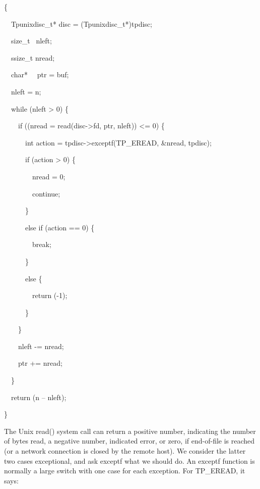 {\ttfamily\mdseries
\{}

{\ttfamily\mdseries
\ \ Tpunixdisc\_t* disc = (Tpunixdisc\_t*)tpdisc;}


\bigskip

{\ttfamily\mdseries
\ \ size\_t \ nleft;}

{\ttfamily\mdseries
\ \ ssize\_t nread;}

{\ttfamily\mdseries
\ \ char* \ \ ptr = buf;}


\bigskip

{\ttfamily\mdseries
\ \ nleft = n;}

{\ttfamily\mdseries
\ \ while (nleft {\textgreater} 0) \{}

{\ttfamily\mdseries
\ \ \ \ if ((nread = read(disc-{\textgreater}fd, ptr, nleft)) {\textless}= 0) \{}

{\ttfamily\mdseries
\ \ \ \ \ \ int action = tpdisc-{\textgreater}exceptf(TP\_EREAD, \&nread, tpdisc);}

{\ttfamily\mdseries
\ \ \ \ \ \ if (action {\textgreater} 0) \{}

{\ttfamily\mdseries
\ \ \ \ \ \ \ \ nread = 0;}

{\ttfamily\mdseries
\ \ \ \ \ \ \ \ continue;}

{\ttfamily\mdseries
\ \ \ \ \ \ \}}

{\ttfamily\mdseries
\ \ \ \ \ \ else if (action == 0) \{}

{\ttfamily\mdseries
\ \ \ \ \ \ \ \ break;}

{\ttfamily\mdseries
\ \ \ \ \ \ \}}

{\ttfamily\mdseries
\ \ \ \ \ \ else \{}

{\ttfamily\mdseries
\ \ \ \ \ \ \ \ return (-1);}

{\ttfamily\mdseries
\ \ \ \ \ \ \}}

{\ttfamily\mdseries
\ \ \ \ \}}


\bigskip

{\ttfamily\mdseries
\ \ \ \ nleft -= nread;}

{\ttfamily\mdseries
\ \ \ \ ptr += nread;}

{\ttfamily\mdseries
\ \ \}}

{\ttfamily\mdseries
\ \ return (n -- nleft);}

{\ttfamily\mdseries
\}}


The Unix read() system call can return a positive number, indicating
the number of bytes read, a negative number, indicated error, or zero,
if end-of-file is reached (or a network connection is closed by the
remote host). We consider the latter two cases exceptional, and ask
exceptf what we should do. An exceptf function is normally a large
switch with one case for each exception. For TP\_EREAD, it says:

